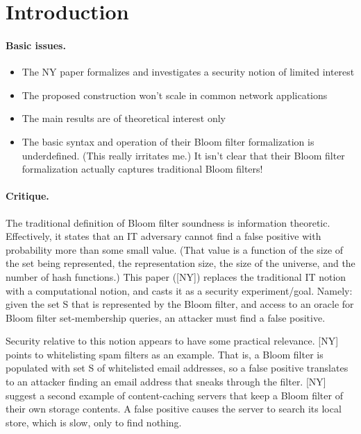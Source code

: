 \section{Introduction}
\paragraph{Basic issues. }
\begin{itemize}
\item The NY paper formalizes and investigates a security notion of limited interest
\item The proposed construction won’t scale in common network applications
\item The main results are of theoretical interest only
\item The basic syntax and operation of their Bloom filter formalization is underdefined.  (This really irritates me.)  It isn’t clear that their Bloom filter formalization actually captures traditional Bloom filters!
\end{itemize}

\paragraph{Critique. }
The traditional definition of Bloom filter soundness is information theoretic.  Effectively, it states that an IT adversary cannot find a false positive with probability more than some small value.  (That value is a function of the size of the set being represented, the representation size, the size of the universe, and the number of hash functions.)  This paper ([NY]) replaces the traditional IT notion with a computational notion, and casts it as a security experiment/goal.  Namely: given the set S that is represented by the Bloom filter, and access to an oracle for Bloom filter set-membership queries, an attacker must find a false positive.  


Security relative to this notion appears to have some practical relevance.  [NY] points to whitelisting spam filters as an example.  That is, a Bloom filter is populated with set S of whitelisted email addresses, so a false positive translates to an attacker finding an email address that sneaks through the filter.  [NY] suggest a second example of content-caching servers that keep a Bloom filter of their own storage contents.  A false positive causes the server to search its local store, which is slow, only to find nothing.

